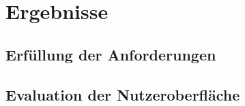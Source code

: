 \chapter{Ergebnisse}

\section{Erf\"ullung der Anforderungen}

\section{Evaluation der Nutzeroberfl\"ache}

